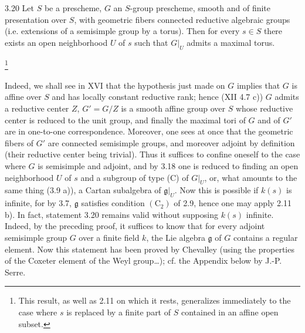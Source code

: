 \begin{corollary}{3.20}\label{XIV.3.20}
Let $S$ be a prescheme,
$G$ an $S$-group prescheme,
smooth and of finite
presentation over $S$,
with geometric fibers
connected reductive
algebraic groups (i.e.
extensions of a
semisimple group by
a torus). Then for
every $s\in S$ there
exists an open
neighborhood $U$ of
$s$ such that $G|_U$
admits a maximal torus.%
{\renewcommand{\thefootnote}{*}\footnote{This
result, as well as
2.11 on which it
rests, generalizes
immediately to the
case where $s$ is
replaced by a finite
part of $S$ contained
in an affine open
subset.}\addtocounter{footnote}{-1}}
\end{corollary}
Indeed, we shall see
in XVI that the
hypothesis just made
on $G$ implies that
$G$ is affine over
$S$ and has locally
constant reductive
rank; hence (XII
4.7 c)) $G$ admits
a reductive center
$Z$, $G'=G/Z$ is
a smooth affine
group over $S$ whose
reductive center is
reduced to the unit
group, and finally
the maximal tori
of $G$ and of $G'$
are in one-to-one
correspondence. Moreover,
one sees at once
that the geometric
fibers of $G'$ are
connected semisimple
groups, and moreover
adjoint by definition
(their reductive center
being trivial). Thus
it suffices to confine
oneself to the case
where $G$ is semisimple
and adjoint, and by
3.18 one is reduced
to finding an open
neighborhood $U$ of
$s$ and a subgroup
of type (C) of $G|_U$,
or, what amounts to
the same thing
(3.9 a)), a Cartan
subalgebra of
$\mathfrak g|_U$.
Now this is possible
if $k(s)$ is infinite,
for by 3.7,
$\mathfrak g$ satisfies
condition $(\mathrm C_2)$
of 2.9, hence one
may apply 2.11 b).
In fact, statement
3.20 remains valid
without supposing
$k(s)$ infinite.
Indeed, by the
preceding proof,
it suffices to know
that for every
adjoint semisimple
group $G$ over a
finite field $k$,
the Lie algebra
$\mathfrak g$ of
$G$ contains a
regular element.
Now this statement
has been proved by
Chevalley (using the
properties of the
Coxeter element
of the Weyl group\ldots);
cf. the Appendix
below by J.-P. Serre.

